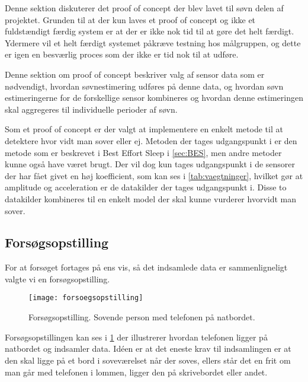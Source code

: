 Denne sektion diskuterer det proof of concept der blev lavet til søvn delen af projektet.
Grunden til at der kun laves et proof of concept og ikke et fuldstændigt færdig system er at der er ikke nok tid til at gøre det helt færdigt. 
Ydermere vil et helt færdigt systemet påkræve testning hos målgruppen, og dette er igen en besværlig proces som der ikke er tid nok til at udføre. 

Denne sektion om proof of concept beskriver valg af sensor data som er nødvendigt, hvordan søvnestimering udføres på denne data, og hvordan søvn estimeringerne for de forskellige sensor kombineres og hvordan denne estimeringen skal aggregeres til individuelle perioder af søvn.


Som et proof of concept er der valgt at implementere en enkelt metode til at detektere hvor vidt man sover eller ej.
Metoden der tages udgangspunkt i er den metode som er beskrevet i Best Effort Sleep i \cref{sec:BES}, men andre metoder kunne også have været brugt.
Der vil dog kun tages udgangspunkt i de sensorer der har fået givet en høj koefficient, som kan ses i \cref{tab:vaegtninger}, hvilket gør at amplitude og acceleration er de datakilder der tages udgangspunkt i.
Disse to datakilder kombineres til en enkelt model der skal kunne vurderer hvorvidt man sover.

\subsection{Forsøgsopstilling}
For at forsøget fortages på ens vis, så det indsamlede data er sammenligneligt valgte vi en forsøgsopstilling.
\begin{figure}[h]
	\centering
	\texttt{[image: forsoegsopstilling]}
	\caption{Forsøgsopstilling. Sovende person med telefonen på natbordet.}
	\label{fig:forsoegopstillings}
\end{figure}

Forsøgsopstillingen kan ses i \cref{fig:forsoegopstillings} der illustrerer hvordan telefonen ligger på natbordet og indsamler data.
Idéen er at det eneste krav til indsamlingen er at den skal ligge på et bord i soveværelset når der soves, ellers står det en frit om man går med telefonen i lommen, ligger den på skrivebordet eller andet.

